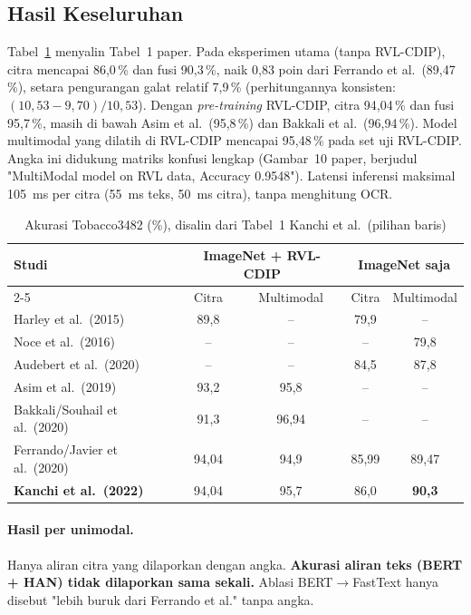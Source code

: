 \subsection{Hasil Keseluruhan}
Tabel~\ref{tab:kanchi} menyalin Tabel~1 paper. Pada eksperimen utama (tanpa RVL-CDIP),
citra mencapai 86,0\,\% dan fusi 90,3\,\%, naik 0,83 poin dari Ferrando et al.\ (89,47\,\%),
setara pengurangan galat relatif 7,9\,\% (perhitungannya konsisten:
$(10{,}53-9{,}70)/10{,}53$). Dengan \emph{pre-training} RVL-CDIP, citra 94,04\,\% dan fusi
95,7\,\%, masih di bawah Asim et al.\ (95,8\,\%) dan Bakkali et al.\ (96,94\,\%). Model
multimodal yang dilatih di RVL-CDIP mencapai 95,48\,\% pada set uji RVL-CDIP. Angka ini
didukung matriks konfusi lengkap (Gambar~10 paper, berjudul "MultiModal model on RVL
data, Accuracy 0.9548"). Latensi inferensi
maksimal 105~ms per citra (55~ms teks, 50~ms citra), tanpa menghitung OCR.

\begin{table}[H]
  \centering
  \caption{Akurasi Tobacco3482 (\%), disalin dari Tabel~1 Kanchi et al.\ (pilihan baris)}
  \label{tab:kanchi}
  \fontsize{10}{12}\selectfont
  \begin{tabular}{|l|c|c|c|c|}
    \hline
    \multirow{2}{*}{\textbf{Studi}} & \multicolumn{2}{c|}{\textbf{ImageNet + RVL-CDIP}} & \multicolumn{2}{c|}{\textbf{ImageNet saja}} \\ \cline{2-5}
     & Citra & Multimodal & Citra & Multimodal \\ \hline
    Harley et al.\ (2015) & 89,8 & -- & 79,9 & -- \\ \hline
    Noce et al.\ (2016) & -- & -- & -- & 79,8 \\ \hline
    Audebert et al.\ (2020) & -- & -- & 84,5 & 87,8 \\ \hline
    Asim et al.\ (2019) & 93,2 & 95,8 & -- & -- \\ \hline
    Bakkali/Souhail et al.\ (2020) & 91,3 & 96,94 & -- & -- \\ \hline
    Ferrando/Javier et al.\ (2020) & 94,04 & 94,9 & 85,99 & 89,47 \\ \hline
    \textbf{Kanchi et al.\ (2022)} & 94,04 & 95,7 & 86,0 & \textbf{90,3} \\ \hline
  \end{tabular}
\end{table}

\paragraph{Hasil per unimodal.} Hanya aliran citra yang dilaporkan dengan angka.
\textbf{Akurasi aliran teks (BERT + HAN) tidak dilaporkan sama sekali.} Ablasi
BERT$\to$FastText hanya disebut "lebih buruk dari Ferrando et al." tanpa angka.

